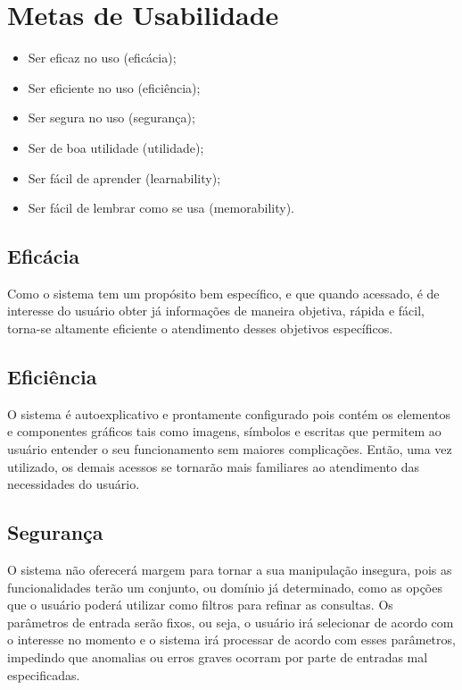 \chapter[Metas de Usabilidade]{Metas de Usabilidade}
	\label{sec:metasUsabilidade}

		\begin{itemize}
			\item{Ser eficaz no uso (eficácia);}
			\item{Ser eficiente no uso (eficiência);}
			\item{Ser segura no uso (segurança);}
			\item{Ser de boa utilidade (utilidade);}
			\item{Ser fácil de aprender (learnability);}
			\item{Ser fácil de lembrar como se usa (memorability).}
		\end{itemize}

	\section[Eficácia]{Eficácia}
	\label{sec:metasUsabilidade_eficacia}

		Como o sistema tem um propósito bem específico, e que quando acessado, é de interesse do usuário obter já informações de maneira objetiva, rápida e fácil, torna-se altamente eficiente o atendimento desses objetivos específicos. 

	\section[Eficiência]{Eficiência}
	\label{sec:metasUsabilidade_eficiencia}

		O sistema é autoexplicativo e prontamente configurado pois contém os elementos e componentes gráficos tais como imagens, símbolos e escritas que permitem ao usuário entender o seu funcionamento sem maiores complicações. Então, uma vez utilizado, os demais acessos se tornarão mais familiares ao atendimento das necessidades do usuário. 

	\section[Segurança]{Segurança}
	\label{sec:metasUsabilidade_eficiencia}

		O sistema não oferecerá margem para tornar a sua manipulação insegura, pois as funcionalidades terão um conjunto, ou domínio já determinado, como as opções que o usuário poderá utilizar como filtros para refinar as consultas. Os parâmetros de entrada serão fixos, ou seja, o usuário irá selecionar de acordo com o interesse no momento e o sistema irá processar de acordo com esses parâmetros, impedindo que anomalias ou erros graves ocorram por parte de entradas mal especificadas.

